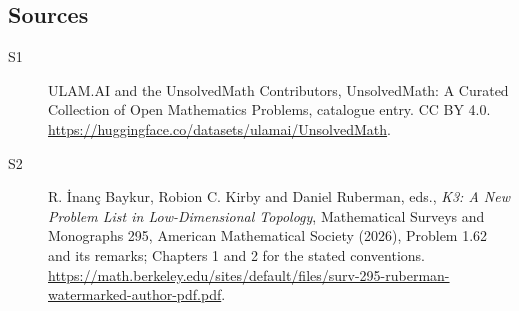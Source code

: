 \documentclass[11pt]{article}
\begin{document}
\subsection{Sources}
\begin{description}
\item[\hypertarget{source:statement:1}{S1}] ULAM.AI and the UnsolvedMath Contributors, UnsolvedMath: A Curated Collection of Open Mathematics Problems, catalogue entry. CC BY 4.0. \url{https://huggingface.co/datasets/ulamai/UnsolvedMath}.
\item[\hypertarget{source:statement:2}{S2}] R. İnanç Baykur, Robion C. Kirby and Daniel Ruberman, eds., \emph{K3: A New Problem List in Low-Dimensional Topology}, Mathematical Surveys and Monographs 295, American Mathematical Society (2026), Problem 1.62 and its remarks; Chapters 1 and 2 for the stated conventions. \url{https://math.berkeley.edu/sites/default/files/surv-295-ruberman-watermarked-author-pdf.pdf}.
\end{description}
\label{end:statement}
\end{document}
